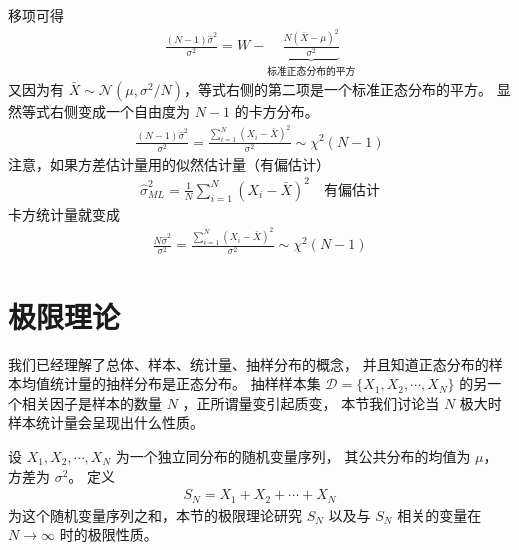 \documentclass[letterpaper,10pt,english]{sphinxmanual}
\begin{document}
移项可得
\begin{equation}\label{equation:推断与检验/content:推断与检验/content:16}
\begin{split}\frac{(N-1) \hat{\sigma}^2}{\sigma^2} = W - \underbrace{ \frac{ N (\bar{X}-\mu)^2 }{\sigma^2}}_{\text{标准正态分布的平方}}\end{split}
\end{equation}
又因为有 \(\bar{X} \sim \mathcal{N}(\mu,\sigma^2/N)\)，等式右侧的第二项是一个标准正态分布的平方。
显然等式右侧变成一个自由度为 \(N-1\) 的卡方分布。
\begin{equation}\label{equation:推断与检验/content:推断与检验/content:17}
\begin{split}\frac{(N-1) \hat{\sigma}^2}{\sigma^2} =\frac{ \sum_{i=1}^N (X_i-\bar{X})^2 }{\sigma^2}  \sim \chi^2(N-1)\end{split}
\end{equation}
注意，如果方差估计量用的似然估计量（有偏估计）
\begin{equation}\label{equation:推断与检验/content:推断与检验/content:18}
\begin{split}\hat{\sigma}^2_{ML} = \frac{1}{N} \sum_{i=1}^N (X_i-\bar{X})^2  \quad \text{有偏估计}\end{split}
\end{equation}
卡方统计量就变成
\begin{equation}\label{equation:推断与检验/content:推断与检验/content:19}
\begin{split}\frac{N \hat{\sigma}^2}{\sigma^2} =\frac{ \sum_{i=1}^N (X_i-\bar{X})^2 }{\sigma^2}  \sim \chi^2(N-1)\end{split}
\end{equation}

\section{极限理论}
\label{\detokenize{_u63a8_u65ad_u4e0e_u68c0_u9a8c/content:id6}}
我们已经理解了总体、样本、统计量、抽样分布的概念，
并且知道正态分布的样本均值统计量的抽样分布是正态分布。
抽样样本集 \(\mathcal{D}=\{X_1,X_2,\cdots,X_N\}\)
的另一个相关因子是样本的数量 \(N\)
，正所谓量变引起质变，
本节我们讨论当 \(N\) 极大时样本统计量会呈现出什么性质。

设 \(X_1,X_2,\cdots,X_N\) 为一个独立同分布的随机变量序列，
其公共分布的均值为 \(\mu\)， 方差为 \(\sigma^2\)。
定义
\begin{equation}\label{equation:推断与检验/content:推断与检验/content:20}
\begin{split}S_N = X_1+X_2+\cdots+X_N\end{split}
\end{equation}
为这个随机变量序列之和，本节的极限理论研究 \(S_N\)
以及与 \(S_N\) 相关的变量在 \(N \rightarrow \infty\)
时的极限性质。
\end{document}
